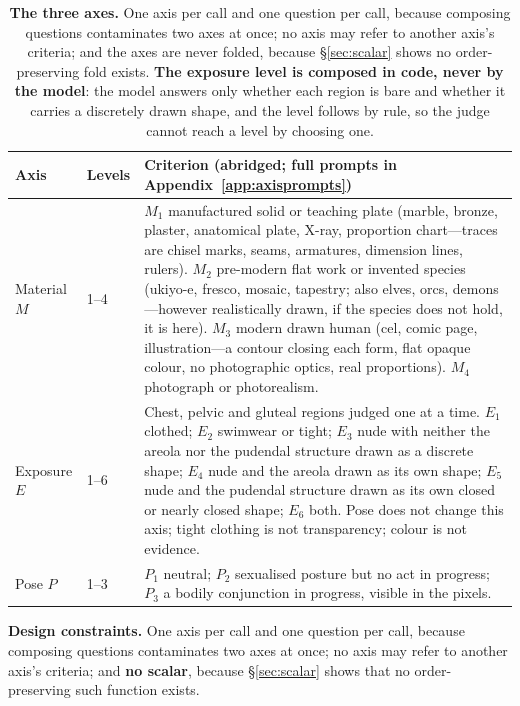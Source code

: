 \documentclass[11pt]{article}
\newcommand{\axm}{M}
\newcommand{\axe}{E}
\newcommand{\axp}{P}
\begin{document}
\begin{table}[t]
\centering\small
\begin{tabularx}{\textwidth}{@{}l l X@{}}
\toprule
Axis & Levels & Criterion (abridged; full prompts in Appendix~\ref{app:axisprompts}) \\
\midrule
Material $\axm$ & 1--4 &
$\axm_1$ manufactured solid or teaching plate (marble, bronze, plaster,
anatomical plate, X-ray, proportion chart---traces are chisel marks, seams,
armatures, dimension lines, rulers). $\axm_2$ pre-modern flat work or invented
species (ukiyo-e, fresco, mosaic, tapestry; also elves, orcs, demons---however
realistically drawn, if the species does not hold, it is here). $\axm_3$ modern
drawn human (cel, comic page, illustration---a contour closing each form, flat
opaque colour, no photographic optics, real proportions). $\axm_4$ photograph
or photorealism. \\
Exposure $\axe$ & 1--6 &
Chest, pelvic and gluteal regions judged one at a time. $\axe_1$ clothed;
$\axe_2$ swimwear or tight; $\axe_3$ nude with neither the areola nor the
pudendal structure drawn as a discrete shape; $\axe_4$ nude and the areola
drawn as its own shape; $\axe_5$ nude and the pudendal structure drawn as its
own closed or nearly closed shape; $\axe_6$ both. Pose does not change this
axis; tight clothing is not transparency; colour is not evidence. \\
Pose $\axp$ & 1--3 &
$\axp_1$ neutral; $\axp_2$ sexualised posture but no act in progress; $\axp_3$
a bodily conjunction in progress, visible in the pixels. \\
\bottomrule
\end{tabularx}
\caption{\textbf{The three axes.} One axis per call and one question per call,
because composing questions contaminates two axes at once; no axis may refer to
another axis's criteria; and the axes are never folded, because
\S\ref{sec:scalar} shows no order-preserving fold exists. \textbf{The exposure
level is composed in code, never by the model}: the model answers only whether
each region is bare and whether it carries a discretely drawn shape, and the
level follows by rule, so the judge cannot reach a level by choosing one.}
\label{tab:axes}
\end{table}

\textbf{Design constraints.} One axis per call and one question per call,
because composing questions contaminates two axes at once; no axis may refer to
another axis's criteria; and \textbf{no scalar}, because \S\ref{sec:scalar}
shows that no order-preserving such function exists.
\end{document}
